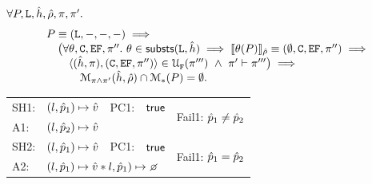 %




\begin{theorem}
$\forall P, \existentials, \sheap, \sstore, \pc, \pc'.$
$$
\begin{array}{l}
   P \equiv (\existentials, -, -, -) \implies \\
   \quad \big( \forall \subst, \cells, \efs, \pfs''.\ \subst \in \substs(\existentials, \sheap) \implies 
   \symbeval{\subst(P)}{\sstore} \equiv (\emptyset, \cells, \efs, \pfs'') \implies \\
   \qquad \unificationfullfail{\sheap, \pc}{\cells, \efs, \pfs''}{}{\pc'''} \ \wedge \  \pc' \vdash \pfs''' \big) \implies \\
   \qquad \quad \smodels{\sheap, \sstore}{\pc \wedge \pc'} \cap \sepmodels{P} = \emptyset.   
\end{array}
$$ 
\end{theorem}


\begin{tabular}{lllll}
\textsc{SH1:} & $(\loc, \sexprp_1) \mapsto \sexprv$ & \textsc{PC1: } &  $\jtrue$ &  \multirow{2}{*}{Fail1: $\sexprp_1 \neq \sexprp_2$} \\
\textsc{A1:}    & \multicolumn{3}{l}{$(\loc, \sexprp_2) \mapsto \sexprv$}  &  \\[3pt]
%
\textsc{SH2:} & $(\loc, \sexprp_1) \mapsto \sexprv$ & \textsc{PC1: } &  $\jtrue$ &  \multirow{2}{*}{Fail1: $\sexprp_1 = \sexprp_2$} \\
\textsc{A2:}    & \multicolumn{3}{l}{$(\loc, \sexprp_1) \mapsto \sexprv \sep \loc, \sexprp_1) \mapsto \none$}  & 

\end{tabular}




